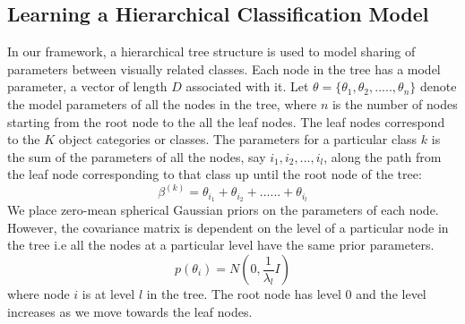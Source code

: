 \documentclass[10pt,twocolumn,letterpaper]{article}
\begin{document}
\subsection{Learning a Hierarchical Classification Model}
In our framework, a hierarchical tree structure is used to model sharing of parameters between 
visually related classes. Each node in the tree has a model parameter, a vector of length $D$ 
associated with it.  Let $ \theta = \{ \theta_{1}, \theta_{2},.....,\theta_{n}\} $ denote the model parameters 
of all the nodes in the tree, where $n$ is the number of nodes starting from the root node to the all the leaf nodes.
The leaf nodes correspond to the $K$ object categories or classes. The parameters for a particular class $k$
is the sum of the parameters of all the nodes, say $i_{1}, i_{2}, ..., i_{l} $, along the path from the leaf node
corresponding to that class up until the root node of the tree:
\begin{equation} \label{beta-theta-rel}
  \beta^{(k)} = \theta_{i_{1}} +  \theta_{i_{2}} + ...... + \theta_{i_{l}}
\end{equation} 
We place zero-mean spherical Gaussian priors on the parameters of each node. However, the 
covariance matrix is dependent on the level of a particular node in the tree i.e all the nodes at
a particular level have the same prior parameters.
\begin{equation}
  p(\theta_{i})  = N(0,\frac{1}{\lambda_{l}}I) 
\end{equation}   
where node $i$ is at level $l$ in the tree. The root node has level 0 and the level increases as 
we move towards the leaf nodes.
\end{document}
